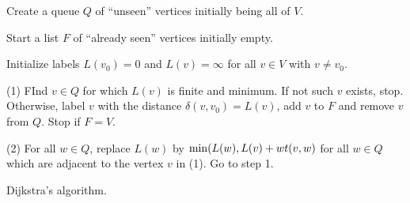 \begin{algorithm}[!htpb]
\SetLine
\dontprintsemicolon  %
\BlankLine
Create a queue $Q$ of ``unseen'' vertices initially being
all of $V$.\;

Start a list $F$ of ``already seen'' vertices initially empty.\;

Initialize labels $L(v_0)=0$ and $L(v)=\infty$ for all
$v\in V$ with $v\not= v_0$.

(1) FInd $v\in Q$ for which $L(v)$ is finite and minimum.
If not such $v$ exists, stop. Otherwise, label $v$ with 
the distance $\delta(v,v_0)=L(v)$, add $v$ to $F$ and 
remove $v$ from $Q$. Stop if $F=V$.

(2) For all $w\in Q$, replace $L(w)$ by
${\rm min}(L(w),L(v)+wt(v,w)$ for all $w\in Q$ which are 
adjacent to the vertex $v$ in (1).
Go to step 1.

\caption{Dijkstra's algorithm.}
\label{alg:graph_algorithms:dijkstra}
\end{algorithm}


